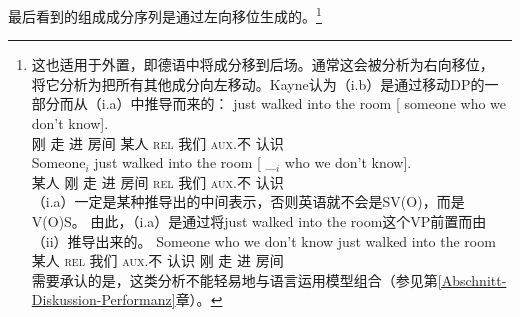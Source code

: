 最后看到的组成成分序列是通过左向移位生成的。\footnote{\label{fn-Kayne-Extraposition}%
这也适用于外置，即德语中将成分移到后场。通常这会被分析为右向移位， \citet[\S~9]{Kayne94a-u}将它分析为把所有其他成分向左移动。Kayne认为（i.b）是通过移动DP的一部分而从（i.a）中推导而来的：
\eal
\ex 
\gll just walked into the           room [ someone who we don't know].\\
     刚   走      进     房间 {}         某人     \textsc{rel}  我们 \textsc{aux}.不 认识\\
\ex 
\gll Someone$_i$ just walked into the         room [ \_$_i$ who we don't know].\\
     某人         刚   走     进    房间 {}        {}     \textsc{rel} 我们 \textsc{aux}.不 认识\\
\zl
（i.a）一定是某种推导出的中间表示，否则英语就不会是SV(O)，而是V(O)S。
由此，（i.a）是通过将just walked into the room这个VP前置而由（ii）推导出来的。
\ea
\gll Someone who we don't know just walked into the room\\
某人 \textsc{rel} 我们 \textsc{aux}.不 认识 刚 走 进  房间\\
\z
需要承认的是，这类分析不能轻易地与语言运用模型组合（参见第\ref{Abschnitt-Diskussion-Performanz}章）。
}
